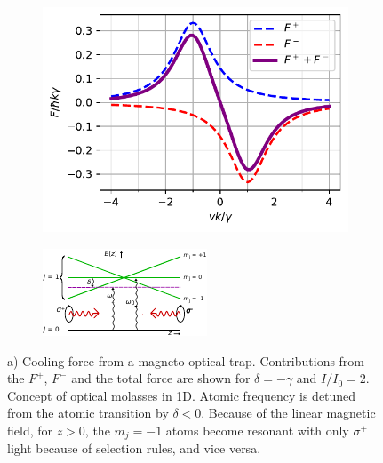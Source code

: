 \begin{figure}
\centering
	\begin{subfigure}{.38\textwidth}
		\centering
		\includegraphics[width=\linewidth]{figures/MOTplot.pdf}
		\caption{}
		\label{fig:MOTcooling}
	\end{subfigure}
	\begin{subfigure}{.52\textwidth}
		\centering
		\includegraphics[width=\linewidth]{figures/OpticalMolasses.pdf}
		\caption{}
		\label{fig:MOTconcept}
	\end{subfigure}
	\caption{a) Cooling force from a magneto-optical trap. Contributions from the $F^+$, $F^-$ and the total force are shown for $\delta = -\gamma$ and $I/I_0 = 2.$ Concept of optical molasses in 1D. Atomic frequency is detuned from the atomic transition by $\delta<0$. Because of the linear magnetic field, for $z>0$, the $m_j=-1$ atoms become resonant with only $\sigma^+$ light because of selection rules, and vice versa.}
	\label{fig:MOTPlots}
\end{figure}

